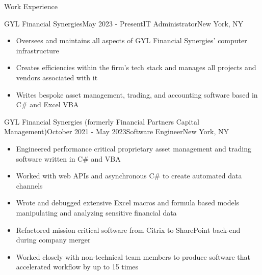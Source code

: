 \documentclass{resume} %
\begin{document}
\begin{rSection}{Work Experience}


\begin{rSubsection}
{GYL Financial Synergies}{May 2023 - Present}{IT Administrator}{New York, NY}
\item[]\renewcommand\labelitemi{$\vcenter{\hbox{\tiny$\bullet$}}$}\begin{itemize}
    \item Oversees and maintains all aspects of GYL Financial Synergies' computer infrastructure
    \vspace{-1mm}
    \item Creates efficiencies within the firm's tech stack and manages all  projects and vendors associated with it
    \vspace{-1mm}
    \item Writes bespoke asset management, trading, and accounting software based in C\# and Excel VBA
    \vspace{-1mm}

\end{itemize}
\end{rSubsection}
\begin{rSubsection}
{GYL Financial Synergies (formerly Financial Partners Capital Management)}{October 2021 - May 2023}{Software Engineer}{New York, NY}
\item[]\renewcommand\labelitemi{$\vcenter{\hbox{\tiny$\bullet$}}$}\begin{itemize}
    \item Engineered performance critical proprietary asset management and trading software written in C\# and VBA
    \vspace{-1mm}
    \item Worked with web APIs and asynchronous C\# to create automated data channels 
    \vspace{-1mm}
    \item Wrote and debugged extensive Excel macros and formula based models manipulating and analyzing sensitive financial data
    \vspace{-1mm}
    \item Refactored mission critical software from Citrix to SharePoint back-end during company merger
    \vspace{-1mm}
    \item Worked closely with non-technical team members to produce software that accelerated workflow by up to 15 times
    
\end{itemize}
\end{rSubsection}
\vspace{-1mm}
\end{rSection}
\end{document}
